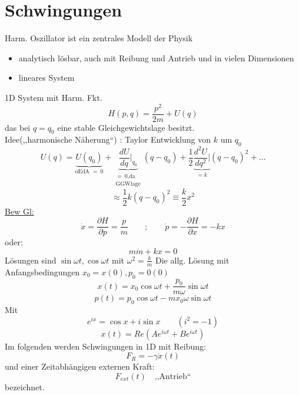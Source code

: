 \documentclass[titlepage,12pt,a4paper,ngerman]{report}
\newcommand{\tx}[1]{\textrm{#1}}
\begin{document}
{\section{Schwingungen}
Harm. Oszillator ist ein zentrales Modell der Physik
\begin{itemize}
	\item analytisch lösbar, auch mit Reibung und Antrieb und in vielen Dimensionen
	\item lineares System
\end{itemize}

1D System mit Harm. Fkt.
$$ H(p,q) = \frac{p^2}{2m} + U(q)$$
das bei $q = q_0$ eine stable Gleichgewichtslage besitzt.\\
Idee(,,harmonische Näherung``) : Taylor Entwicklung von $k$ um $q_0$
$$U(q) = \underbrace{U(q_0)}_{\textrm{oEdA } =\  0} + \underbrace{\frac{dU}{dq} \bigg|_{q_0}}_{\substack{ =\  0 \tx{,da}\\ \textrm{GGWlage}}} (q-q_0) + \frac{1}{2} \underbrace{ \frac{d^2 U}{d q^2} \bigg|}_{= k} (q-q_0)^2 + \dots$$
$$\approx \frac{1}{2} k (q-q_0)^2 \equiv \frac{k}{2} x^2$$
\underline{Bew Gl:} 
$$ \dot{x} = \frac{\partial H}{\partial p }= \frac{p}{m} \qquad; \qquad \dot{p} = - \frac{\partial H}{\partial x} = -kx$$
oder: $$ m\ddot{m} + kx = 0$$
Lösungen sind $\sin \omega t, \cos \omega t$ mit $\omega^2 = \frac{k}{m}$
Die allg. Lösung mit Anfangsbedingungen $x_0 = x(0) , p_0 = 0(0)$
$$x(t) = x_0 \cos \omega t + \frac{p_0}{m \omega} \sin \omega t$$
$$p(t) = p_0 \cos \omega t - m x_0 \omega \sin \omega t$$
Mit $$ e^{ix} = \cos x + i \sin x \qquad (i^2 = -1)$$
$$x(t) = Re(A e^{i\omega t} + B e^{i\omega t} )$$
Im folgenden werden Schwingungen in 1D mit Reibung:
$$ F_R = -\gamma \dot{x}(t)$$
und einer Zeitabhängigen externen Kraft:
$$F_{ext}(t) \quad \textrm{,,Antrieb``}$$
bezeichnet.
}
\end{document}
